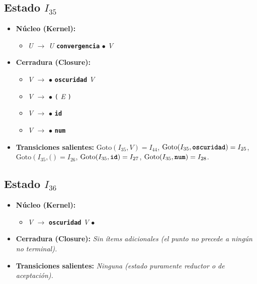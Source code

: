 \documentclass[12pt, letterpaper]{article}
\begin{document}
\subsection*{Estado $I_{35}$ }
\begin{itemize}\setlength{\itemsep}{1pt}\setlength{\parskip}{0pt}
\item \textbf{Núcleo (Kernel):}
\begin{itemize}\setlength{\itemsep}{1pt}\setlength{\parskip}{0pt}
    \item \textit{U} $\to$ \textit{U} \textbf{\texttt{convergencia}} $\bullet$ \textit{V}
\end{itemize}
\item \textbf{Cerradura (Closure):}
\begin{itemize}\setlength{\itemsep}{1pt}\setlength{\parskip}{0pt}
    \item \textit{V} $\to$ $\bullet$ \textbf{\texttt{oscuridad}} \textit{V}
    \item \textit{V} $\to$ $\bullet$ \texttt{(} \textit{E} \texttt{)}
    \item \textit{V} $\to$ $\bullet$ \textbf{\texttt{id}}
    \item \textit{V} $\to$ $\bullet$ \textbf{\texttt{num}}
\end{itemize}
\item \textbf{Transiciones salientes:} $\text{Goto}(I_{35}, \textit{V}) = I_{44}$, \quad $\text{Goto}(I_{35}, \textbf{\texttt{oscuridad}}) = I_{25}$, \quad $\text{Goto}(I_{35}, \texttt{(}) = I_{26}$, \quad $\text{Goto}(I_{35}, \textbf{\texttt{id}}) = I_{27}$, \quad $\text{Goto}(I_{35}, \textbf{\texttt{num}}) = I_{28}$.
\end{itemize}
\vspace{2pt}
\subsection*{Estado $I_{36}$ }
\begin{itemize}\setlength{\itemsep}{1pt}\setlength{\parskip}{0pt}
\item \textbf{Núcleo (Kernel):}
\begin{itemize}\setlength{\itemsep}{1pt}\setlength{\parskip}{0pt}
    \item \textit{V} $\to$ \textbf{\texttt{oscuridad}} \textit{V} $\bullet$ 
\end{itemize}
\item \textbf{Cerradura (Closure):} \emph{Sin ítems adicionales (el punto no precede a ningún no terminal).}
\item \textbf{Transiciones salientes:} \emph{Ninguna (estado puramente reductor o de aceptación).}
\end{itemize}
\vspace{2pt}
\end{document}

